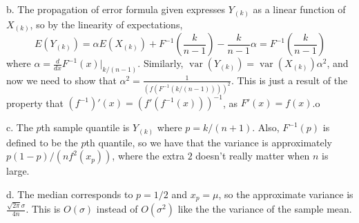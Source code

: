 \documentclass{article}
\DeclareMathOperator{\var}{var}
\begin{document}
\noindent b. The propagation of error formula given expresses $Y_{(k)}$ as a linear function of $X_{(k)}$, so by the linearity of expectations,
$$E(Y_{(k)})=\alpha E(X_{(k)})+F^{-1}\left(\frac{k}{n-1}\right)-\frac{k}{n-1}\alpha=F^{-1}\left(\frac{k}{n-1}\right)$$
where $\alpha=\frac{d}{dx}F^{-1}(x)\big|_{k/(n-1)}$. Similarly, $\var(Y_{(k)})=\var(X_{(k)})\alpha^2$, and now we need to show that $\alpha^2=\frac{1}{(f(F^{-1}(k/(n-1))))^2}$. This is just a result of the property that $(f^{-1})'(x)=(f'(f^{-1}(x)))^{-1}$, as $F'(x)=f(x)$.o

\noindent c. The $p$th sample quantile is $Y_{(k)}$ where $p=k/(n+1)$. Also, $F^{-1}(p)$ is defined to be the $p$th quantile, so we have that the variance is approximately $p(1-p)/(nf^2(x_p))$, where the extra $2$ doesn't really matter when $n$ is large.

\noindent d. The median corresponds to $p=1/2$ and $x_p=\mu$, so the approximate variance is $\frac{\sqrt{2\pi}\sigma}{4n}$. This is $O(\sigma)$ instead of $O(\sigma^2)$ like the the variance of the sample mean.
\end{document}

